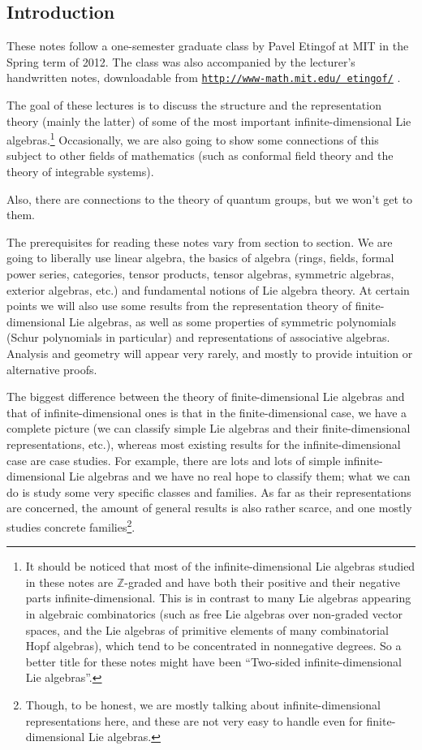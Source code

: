 \documentclass[etingof-lie.tex]{subfiles}
\begin{document}
\subsection{Introduction}

These notes follow a one-semester graduate class by Pavel Etingof at MIT in
the Spring term of 2012. The class was also accompanied by the lecturer's
handwritten notes, downloadable from
\texttt{\href{http://www-math.mit.edu/~etingof/}{\texttt{http://www-math.mit.edu/%
etingof/}}} .

The goal of these lectures is to discuss the structure and the representation
theory (mainly the latter) of some of the most important infinite-dimensional
Lie algebras.\footnote{It should be noticed that most of the
infinite-dimensional Lie algebras studied in these notes are $\mathbb{Z}%
$-graded and have both their positive and their negative parts
infinite-dimensional. This is in contrast to many Lie algebras appearing in
algebraic combinatorics (such as free Lie algebras over non-graded vector
spaces, and the Lie algebras of primitive elements of many combinatorial Hopf
algebras), which tend to be concentrated in nonnegative degrees. So a better
title for these notes might have been ``Two-sided infinite-dimensional Lie
algebras''.} Occasionally, we are also going to show some connections of this
subject to other fields of mathematics (such as conformal field theory and the
theory of integrable systems).

\begin{verlong}
Also, there are connections to the theory of quantum groups, but we won't get
to them.
\end{verlong}

The prerequisites for reading these notes vary from section to section. We are
going to liberally use linear algebra, the basics of algebra (rings, fields,
formal power series, categories, tensor products, tensor algebras, symmetric
algebras, exterior algebras, etc.) and fundamental notions of Lie algebra
theory. At certain points we will also use some results from the
representation theory of finite-dimensional Lie algebras, as well as some
properties of symmetric polynomials (Schur polynomials in particular) and
representations of associative algebras. Analysis and geometry will appear
very rarely, and mostly to provide intuition or alternative proofs.

The biggest difference between the theory of finite-dimensional Lie algebras
and that of infinite-dimensional ones is that in the finite-dimensional case,
we have a complete picture (we can classify simple Lie algebras and their
finite-dimensional representations, etc.), whereas most existing results for
the infinite-dimensional case are case studies. For example, there are lots
and lots of simple infinite-dimensional Lie algebras and we have no real hope
to classify them; what we can do is study some very specific classes and
families. As far as their representations are concerned, the amount of general
results is also rather scarce, and one mostly studies concrete
families\footnote{Though, to be honest, we are mostly talking about
infinite-dimensional representations here, and these are not very easy to
handle even for finite-dimensional Lie algebras.}.
\end{document}
